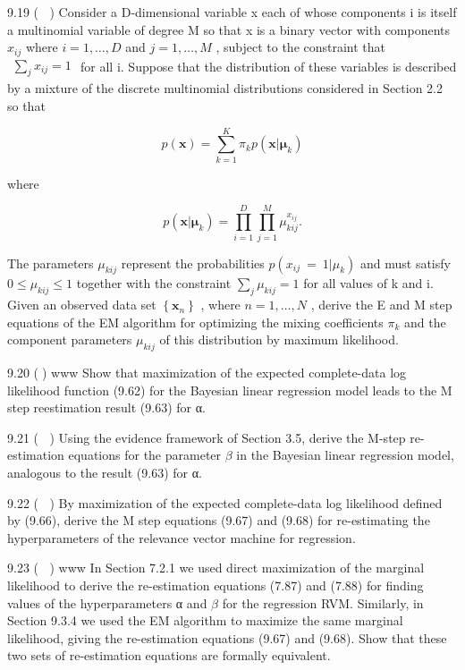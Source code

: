 \documentclass[
  10
]{article}
\begin{document}
9.19 ( ) Consider a D-dimensional variable x each of whose components i
is itself a multinomial variable of degree M so that x is a binary
vector with components \(x _ { i j }\) where \(i = 1 , \ldots , D\) and
\(j = 1 , \dots , M\) , subject to the constraint that
\(\begin{array} { r } { \sum _ { j } x _ { i j } = 1 } \end{array}\) for
all i. Suppose that the distribution of these variables is described by
a mixture of the discrete multinomial distributions considered in
Section 2.2 so that

\[
p (\mathbf {x}) = \sum_ {k = 1} ^ {K} \pi_ {k} p (\mathbf {x} | \boldsymbol {\mu} _ {k})\tag{9.84}
\]

where

\[
p (\mathbf {x} | \boldsymbol {\mu} _ {k}) = \prod_ {i = 1} ^ {D} \prod_ {j = 1} ^ {M} \mu_ {k i j} ^ {x _ {i j}}.\tag{9.85}
\]

The parameters \(\mu _ { k i j }\) represent the probabilities
\(p ( x _ { i j } \ = \ 1 | \mu _ { k } )\) and must satisfy
\(0 \leqslant \mu _ { k i j } \leqslant 1\) together with the constraint
\(\textstyle \sum _ { j } \mu _ { k i j } = 1\) for all values of k and
i. Given an observed data set \(\left\{ \mathbf { x } _ { n } \right\}\)
, where \(n = 1 , \ldots , N\) , derive the E and M step equations of
the EM algorithm for optimizing the mixing coefficients \(\pi _ { k }\)
and the component parameters \(\mu _ { k i j }\) of this distribution by
maximum likelihood.

9.20 () www Show that maximization of the expected complete-data log
likelihood function (9.62) for the Bayesian linear regression model
leads to the M step reestimation result (9.63) for α.

9.21 ( ) Using the evidence framework of Section 3.5, derive the M-step
re-estimation equations for the parameter \(\beta\) in the Bayesian
linear regression model, analogous to the result (9.63) for α.

9.22 ( ) By maximization of the expected complete-data log likelihood
defined by (9.66), derive the M step equations (9.67) and (9.68) for
re-estimating the hyperparameters of the relevance vector machine for
regression.

9.23 ( ) www In Section 7.2.1 we used direct maximization of the
marginal likelihood to derive the re-estimation equations (7.87) and
(7.88) for finding values of the hyperparameters α and \(\beta\) for the
regression RVM. Similarly, in Section 9.3.4 we used the EM algorithm to
maximize the same marginal likelihood, giving the re-estimation
equations (9.67) and (9.68). Show that these two sets of re-estimation
equations are formally equivalent.
\end{document}
